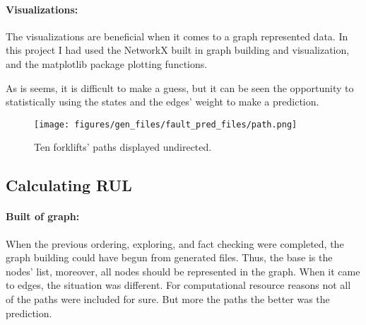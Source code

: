 		\paragraph{Visualizations:}
		The visualizations are beneficial when it comes to a graph represented data. In this project I had used the NetworkX built in graph building and visualization, and the matplotlib package plotting functions.

		As is seems, it is difficult to make a guess, but it can be seen the opportunity to statistically using the states and the edges' weight to make a prediction.
			\begin{figure}[H]
			\centering
			\texttt{[image: figures/gen\_files/fault\_pred\_files/path.png]}
			\caption{Ten forklifts' paths displayed undirected.} 
			\end{figure}
	\subsection{Calculating RUL}
			\paragraph{Built of graph:}
			When the previous ordering, exploring, and fact checking were completed, the graph building could have begun from generated files. Thus, the base is the nodes' list, moreover, all nodes should be represented in the graph. When it came to edges, the situation was different. For computational resource reasons not all of the paths were included for sure. But more the paths the better was the prediction.
